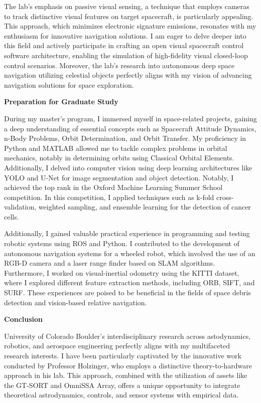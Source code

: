 \documentclass[a4,20pt]{article}
\begin{document}
\begin{large}
The lab's emphasis on passive visual sensing, a technique that employs cameras to track distinctive visual features on target spacecraft, is particularly appealing. This approach, which minimizes electronic signature emissions, resonates with my enthusiasm for innovative navigation solutions. I am eager to delve deeper into this field and actively participate in crafting an open visual spacecraft control software architecture, enabling the simulation of high-fidelity visual closed-loop control scenarios. Moreover, the lab's research into autonomous deep space navigation utilizing celestial objects perfectly aligns with my vision of advancing navigation solutions for space exploration.\vspace{-0.25cm}

\textbf{Preparation for Graduate Study} \vspace{-0.35cm}

During my master's program, I immersed myself in space-related projects, gaining a deep understanding of essential concepts such as Spacecraft Attitude Dynamics, n-Body Problems, Orbit Determination, and Orbit Transfer. My proficiency in Python and MATLAB allowed me to tackle complex problems in orbital mechanics, notably in determining orbits using Classical Orbital Elements. Additionally, I delved into computer vision using deep learning architectures like YOLO and U-Net for image segmentation and object detection. Notably, I achieved the top rank in the Oxford Machine Learning Summer School competition. In this competition, I applied techniques such as k-fold cross-validation, weighted sampling, and ensemble learning for the detection of cancer cells. \vspace{-0.35cm}

Additionally, I gained valuable practical experience in programming and testing robotic systems using ROS and Python. I contributed to the development of autonomous navigation systems for a wheeled robot, which involved the use of an RGB-D camera and a laser range finder based on SLAM algorithms. Furthermore, I worked on visual-inertial odometry using the KITTI dataset, where I explored different feature extraction methods, including ORB, SIFT, and SURF. These experiences are poised to be beneficial in the fields of space debris detection and vision-based relative navigation. \vspace{-0.25cm}


\textbf{Conclusion}  \vspace{-0.35cm}

University of Colorado Boulder's interdisciplinary research across astodynamics, robotics, and aerospace engineering perfectly aligns with my multifaceted research interests. I have been particularly captivated by the innovative work conducted by Professor Holzinger, who employs a distinctive theory-to-hardware approach in his lab. This approach, combined with the utilization of assets like the GT-SORT and OmniSSA Array, offers a unique opportunity to integrate theoretical astrodynamics, controls, and sensor systems with empirical data. \vspace{-0.35cm}


\end{large}
\end{document}
